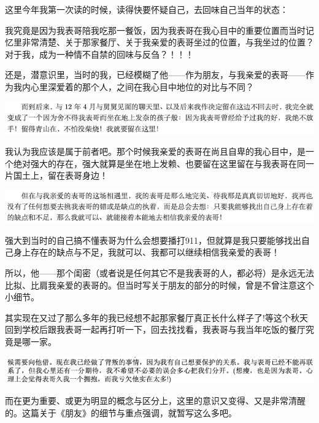 \documentclass[9pt, b5paper]{article}
\begin{document}
这里今年我第一次读的时候，读得快要怀疑自己，去回味自己当年的状态：

我究竟是因为我表哥陪我吃那一餐饭，因为我表哥在我心目中的重要位置而当时记忆里非常清楚、关于那家餐厅、关于我亲爱的表哥坐过的位置，与我坐过的位置？对于我，成为一种情不自禁的回味与反刍？！！！

还是，潜意识里，当时的我，已经模糊了他——作为朋友，与我亲爱的表哥——作为我内心里深爱着的那个人，之间在我心目中地位的对比与不同？

\begin{center}
\includegraphics[width=.9\linewidth]{./pic/backups_plans_20210501_125616.png}
\end{center}

我认为我应该是属于前者吧。那个时候我亲爱的表哥在尚且自卑的我心目中，是一个绝对强大的存在，强大就算是坐在地上发赖、也要留在这里留在与我表哥在同一片国土上，留在表哥身边！

\begin{center}
\includegraphics[width=.9\linewidth]{./pic/backups_plans_20210501_125921.png}
\end{center}

强大到当时的自己搞不懂表哥为什么会想要播打911，但就算是我只要能够找出自己身上存在的缺点与不足，我就可以、我都可以继续相信我亲爱的表哥！

所以，他——那个闺密（或者说是任何其它不是我表哥的人，都必将）是永远无法比拟、比肩我亲爱的表哥的。但当时写关于朋友的部分的时候，曾是不曾注意这个小细节。 

其实现在又过了那么多年的我已经想不起那家餐厅真正长什么样子了!等这个秋天回到学校后跟我表哥一起再打听一下，回去找找看，我表哥与我当年吃饭的餐厅究竟是哪一家。

\begin{center}
\includegraphics[width=.9\linewidth]{./pic/backups_plans_20210501_130013.png}
\end{center}

而在更为重要、或更为明显的概念与区分上，这里的意识又变得、又是非常清醒的。这篇关于《朋友》的细节与重点强调，就暂写这么多吧。
\end{document}
